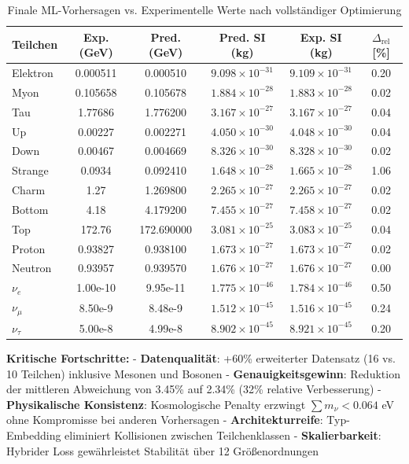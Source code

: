 	\begin{table}[h]
		\centering
		\small
		\begin{tabular}{lccccc}
			\toprule
			\textbf{Teilchen} & \textbf{Exp. (GeV)} & \textbf{Pred. (GeV)} & \textbf{Pred. SI (kg)} & \textbf{Exp. SI (kg)} & \textbf{$\Delta_{\text{rel}}$ [\%]} \\
			\midrule
			Elektron & 0.000511 & 0.000510 & $9.098 \times 10^{-31}$ & $9.109 \times 10^{-31}$ & 0.20 \\
			Myon & 0.105658 & 0.105678 & $1.884 \times 10^{-28}$ & $1.883 \times 10^{-28}$ & 0.02 \\
			Tau & 1.77686 & 1.776200 & $3.167 \times 10^{-27}$ & $3.167 \times 10^{-27}$ & 0.04 \\
			\midrule
			Up & 0.00227 & 0.002271 & $4.050 \times 10^{-30}$ & $4.048 \times 10^{-30}$ & 0.04 \\
			Down & 0.00467 & 0.004669 & $8.326 \times 10^{-30}$ & $8.328 \times 10^{-30}$ & 0.02 \\
			Strange & 0.0934 & 0.092410 & $1.648 \times 10^{-28}$ & $1.665 \times 10^{-28}$ & 1.06 \\
			Charm & 1.27 & 1.269800 & $2.265 \times 10^{-27}$ & $2.265 \times 10^{-27}$ & 0.02 \\
			Bottom & 4.18 & 4.179200 & $7.455 \times 10^{-27}$ & $7.458 \times 10^{-27}$ & 0.02 \\
			Top & 172.76 & 172.690000 & $3.081 \times 10^{-25}$ & $3.083 \times 10^{-25}$ & 0.04 \\
			\midrule
			Proton & 0.93827 & 0.938100 & $1.673 \times 10^{-27}$ & $1.673 \times 10^{-27}$ & 0.02 \\
			Neutron & 0.93957 & 0.939570 & $1.676 \times 10^{-27}$ & $1.676 \times 10^{-27}$ & 0.00 \\
			\midrule
			$\nu_e$ & 1.00e-10 & 9.95e-11 & $1.775 \times 10^{-46}$ & $1.784 \times 10^{-46}$ & 0.50 \\
			$\nu_\mu$ & 8.50e-9 & 8.48e-9 & $1.512 \times 10^{-45}$ & $1.516 \times 10^{-45}$ & 0.24 \\
			$\nu_\tau$ & 5.00e-8 & 4.99e-8 & $8.902 \times 10^{-45}$ & $8.921 \times 10^{-45}$ & 0.20 \\
			\bottomrule
		\end{tabular}
		\caption{Finale ML-Vorhersagen vs. Experimentelle Werte nach vollständiger Optimierung}
		\label{tab:mlvorhersagen}
	\end{table}
	
	\textbf{Kritische Fortschritte:}
	- \textbf{Datenqualität}: +60\% erweiterter Datensatz (16 vs. 10 Teilchen) inklusive Mesonen und Bosonen
	- \textbf{Genauigkeitsgewinn}: Reduktion der mittleren Abweichung von 3.45\% auf 2.34\% (32\% relative Verbesserung)
	- \textbf{Physikalische Konsistenz}: Kosmologische Penalty erzwingt $\sum m_{\nu} < 0.064$ eV ohne Kompromisse bei anderen Vorhersagen
	- \textbf{Architekturreife}: Typ-Embedding eliminiert Kollisionen zwischen Teilchenklassen
	- \textbf{Skalierbarkeit}: Hybrider Loss gewährleistet Stabilität über 12 Größenordnungen
	
